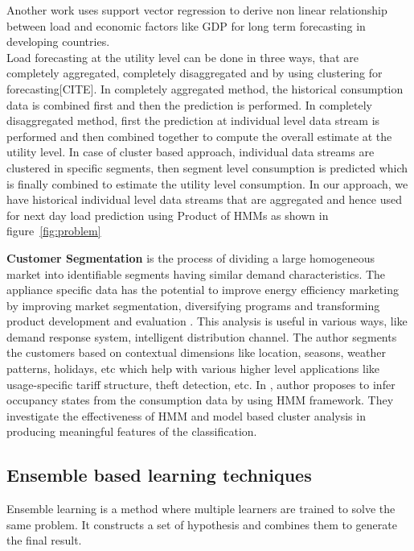 \documentclass{acm_proc_article-sp}
\begin{document}
Another work  \cite{Zhang} uses support vector regression to derive non linear relationship between load and economic factors like GDP for long term forecasting in developing countries.\\
Load forecasting at the utility level can be done in three ways, that are completely aggregated, completely disaggregated and by using clustering for forecasting[CITE]. In completely aggregated method, the historical consumption data is combined first and then the prediction is performed. In completely disaggregated method, first the prediction at individual level data stream is performed and then combined together to compute the overall estimate at the utility level. In case of cluster based approach, individual data streams are clustered in specific segments, then segment level consumption is predicted which is finally combined to estimate the utility level consumption. In our approach, we have historical individual level data streams that are aggregated and hence used for next day load prediction using Product of HMMs as shown in figure~\ref{fig:problem}


\noindent \textbf{Customer Segmentation} is the process of dividing a large homogeneous market into identifiable segments having similar demand characteristics. The appliance specific data has the potential to improve energy efficiency marketing by improving market segmentation, diversifying programs and transforming product development and evaluation \cite{CarrieArmel2013213}. This analysis is useful in various ways, like demand response system, intelligent distribution channel. The author \cite{wijaya2014consumer} segments the customers based on contextual dimensions like location, seasons, weather patterns, holidays, etc which help with various higher level applications like usage-specific tariff structure, theft detection, etc. In \cite{Albert}, author proposes to infer occupancy states from the consumption data by using HMM framework. They investigate the effectiveness of HMM and model based cluster analysis in producing meaningful features of the classification. 

\subsection{Ensemble based learning techniques}
Ensemble learning is a method where multiple learners are trained to solve the same problem. It constructs a set of hypothesis and combines them to generate the final result.
\end{document}
